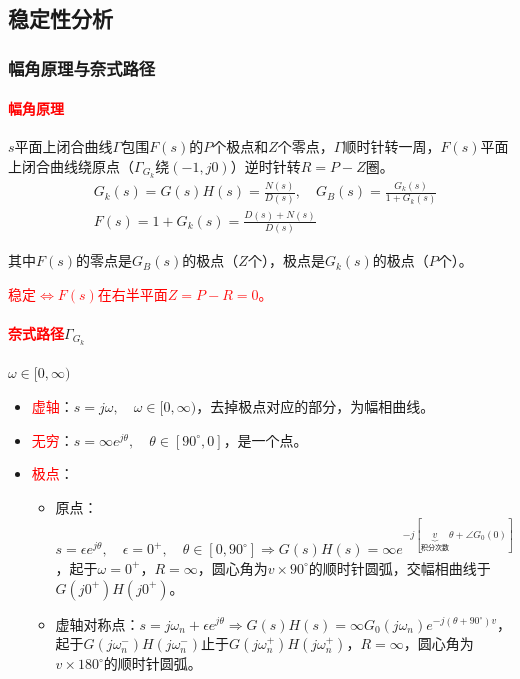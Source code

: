 \documentclass[
12pt, %
a4paper, 
oneside, %
]{scrartcl}
\begin{document}
\subsection[稳定性分析]{稳定性分析}
\subsubsection[幅角原理与奈式路径]{幅角原理与奈式路径}
\paragraph{\textcolor{red}{幅角原理}}
$ s $平面上闭合曲线$ \Gamma $包围$ F(s) $的$ P $个极点和$ Z $个零点，$ \Gamma $顺时针转一周，$ F(s) $平面上闭合曲线绕原点（$ \Gamma_{G_k} $绕$ (-1, j0) $）逆时针转$ R = P - Z $圈。
\begin{align*}
&G_k(s) = G(s)H(s) = \frac{N(s)}{D(s)}, \quad G_B(s) = \frac{G_k(s)}{1 + G_k(s)} \\
&F(s) = 1 + G_k(s) = \frac{D(s) + N(s)}{D(s)} 
\end{align*}

其中$ F(s) $的零点是$ G_B(s) $的极点（$ Z $个），极点是$ G_k(s) $的极点（$ P $个）。

\textcolor{red}{稳定$ \Leftrightarrow $$ F(s) $在右半平面$ Z = P - R = 0 $。}
\paragraph{\textcolor{red}{奈式路径}$ \Gamma_{G_k} $}
$ \omega \in [0, \infty) $
\begin{itemize}
\item \textcolor{red}{虚轴}：$ s = j \omega, \quad \omega \in [0, \infty) $，去掉极点对应的部分，为幅相曲线。
\item \textcolor{red}{无穷}：$ s = \infty e^{j \theta}, \quad \theta \in [90^\circ, 0] $，是一个点。
\item \textcolor{red}{极点}：
\begin{itemize}
\item 原点：$ s = \epsilon e^{j \theta}, \quad \epsilon = 0^+, \quad \theta \in [0, 90^\circ] \Rightarrow G(s)H(s) = \infty e^{-j[\underbrace{v}_{\text{积分次数}} \theta + \angle G_0(0)]} $，起于$ \omega = 0^+ $，$ R = \infty $，圆心角为$ v \times 90^\circ $的顺时针圆弧，交幅相曲线于$ G(j 0^+)H(j 0^+) $。
\item 虚轴对称点：$ s = j \omega_n + \epsilon e^{j \theta} \Rightarrow G(s)H(s) = \infty G_0(j \omega_n) e^{-j(\theta + 90^\circ)v} $，起于$ G(j \omega_n^-)H(j \omega_n^-) $止于$ G(j \omega_n^+)H(j \omega_n^+) $，$ R = \infty $，圆心角为$ v \times 180^\circ $的顺时针圆弧。
\end{itemize}
\end{itemize}
\end{document}

